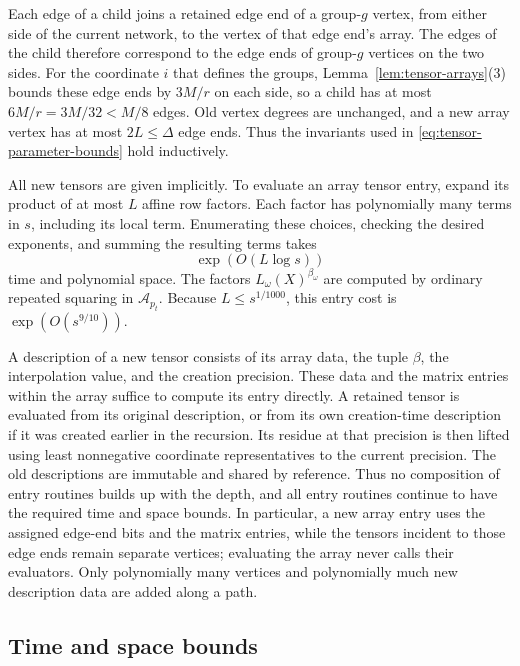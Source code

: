 Each edge of a child joins a retained edge end of a group-$g$ vertex,
from either side of the current network, to the vertex of that edge end's
array. The edges of the child therefore correspond to the edge ends
of group-$g$ vertices on the two sides. For the coordinate $i$ that
defines the groups, Lemma~\ref{lem:tensor-arrays}(3) bounds these
edge ends by $3M/r$ on each side, so a child has at most
$6M/r=3M/32<M/8$ edges.  Old vertex degrees are unchanged, and a
new array vertex has at most $2L\le\Delta$ edge ends.  Thus the
invariants used in \eqref{eq:tensor-parameter-bounds} hold
inductively.

All new tensors are given implicitly.  To evaluate an array
tensor entry, expand its product of at most $L$ affine row
factors.  Each factor has polynomially many terms in $s$,
including its local term.  Enumerating these choices, checking
the desired exponents, and summing the resulting terms takes
\[
 \exp(O(L\log s))
\]
time and polynomial space.  The factors $L_{\omega}(X)^{\beta_{\omega}}$ are
computed by ordinary repeated squaring in $\mathcal A_{p_t}$.
Because $L\le s^{1/1000}$, this entry cost is
$\exp(O(s^{9/10}))$.

A description of a new tensor consists of its array data, the
tuple $\beta$, the interpolation value, and the creation precision.
These data and the matrix entries within the array suffice to compute its entry directly.  A retained tensor
is evaluated from its original description, or from its own
creation-time description if it was created earlier in the
recursion.  Its residue at that precision is then lifted using least nonnegative coordinate representatives to the current precision.  The old descriptions are
immutable and shared by reference.  Thus no composition of
entry routines builds up with the depth, and all entry routines
continue to have the required time and space bounds.
In particular, a new array entry uses the assigned edge-end bits and
the matrix entries, while the tensors incident to those edge ends remain
separate vertices; evaluating the array never calls their evaluators.
Only polynomially many vertices and polynomially much new
description data are added along a path.

\subsection{Time and space bounds}
\label{subsec:tensor-cost}

